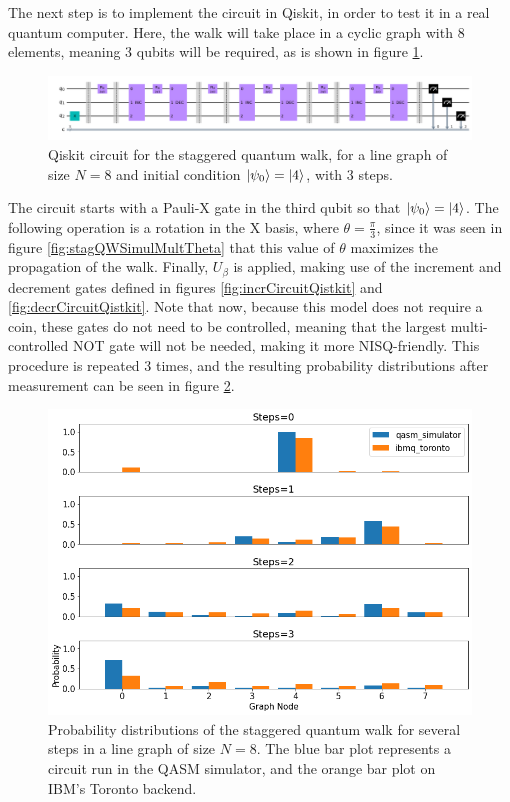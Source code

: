 \documentclass[../../dissertation.tex]{subfiles}
\begin{document}
The next step is to implement the circuit in Qiskit, in order to test it in a
real quantum computer. Here, the walk will take place in a cyclic graph with
$8$ elements, meaning 3 qubits will be required, as is shown in figure
\ref{fig:stagQWCircuitQistkit}.
\begin{figure}[!h]
	\centering
	\includegraphics[scale=0.32]{img/Qiskit/StaggeredQW/Circuits/circStagQW_N3_S3.png}
	\caption{Qiskit circuit for the staggered quantum walk, for a line graph of size $N=8$ and initial condition $\ket{\psi_0}=\ket{4}$, with $3$ steps.} 
	\label{fig:stagQWCircuitQistkit}
\end{figure}
The circuit starts with a Pauli-X gate in the third qubit so that $\ket{\psi_0}
= \ket{4}$. The following operation is a rotation in the X basis, where $\theta
= \frac{\pi}{3}$, since it was seen in figure \ref{fig:stagQWSimulMultTheta}
that this value of $\theta$ maximizes the propagation of the walk. Finally,
$U_\beta$ is applied, making use of the increment and decrement gates defined
in figures \ref{fig:incrCircuitQistkit} and \ref{fig:decrCircuitQistkit}. Note
that now, because this model does not require a coin, these gates do not need
to be controlled, meaning that the largest multi-controlled NOT gate will not
be needed, making it more NISQ-friendly. This procedure is repeated
$3$ times, and the resulting probability distributions after measurement can be
seen in figure \ref{fig:stagQWQiskitDist}. 
\begin{figure}[!h]
	\centering
	\includegraphics[scale=0.40]{img/Qiskit/StaggeredQW/StagQW_N3_S0123.png}
	\caption{Probability distributions of the staggered quantum walk for several steps in a line graph of size $N=8$. The blue bar plot represents a circuit run in the QASM simulator, and the orange bar plot on IBM's Toronto backend.} 
	\label{fig:stagQWQiskitDist}
\end{figure}\par
\end{document}
